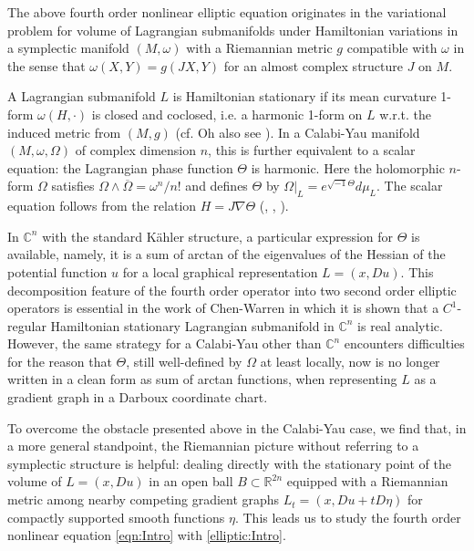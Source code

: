 \documentclass[12pt,leqno]{amsart}%
\theoremstyle{plain}
\numberwithin{equation}{section}
\theoremstyle{definition}
\begin{document}
The above fourth order nonlinear elliptic equation originates in the
variational problem for volume of Lagrangian submanifolds under Hamiltonian
variations in a symplectic manifold $(M,\omega)$ with a Riemannian metric $g$
compatible with $\omega$ in the sense that $\omega(X,Y) =g(JX,Y)$ for an
almost complex structure $J$ on $M$.

A Lagrangian submanifold $L$ is Hamiltonian stationary if its mean curvature
1-form $\omega(H, \cdot)$ is closed and coclosed, i.e. a harmonic 1-form on
$L$ w.r.t. the induced metric from $(M,g)$ (cf. Oh \cite{Oh} also see
\cite[p.1071-1072]{JLS}). In a Calabi-Yau
manifold $(M,\omega,\Omega)$ of complex dimension $n$, this is further equivalent to a scalar equation: the Lagrangian phase function $\Theta$ is harmonic.  Here the holomorphic
$n$-form $\Omega$ satisfies $\Omega\wedge\overline{\Omega}={\omega^{n}%
}/{n!}$ and defines $\Theta$ by $\Omega|_{L} = e^{\sqrt{-1}\Theta}d\mu_{L}$.  
The scalar equation follows from the relation $H=J\nabla\Theta$ (\cite{HL82}, \cite{Oh}, \cite{SWJDG}).

In $\mathbb{C}^{n}$ with the standard K\"ahler structure, a particular
expression for $\Theta$ is available, namely, it is a sum of arctan of the
eigenvalues of the Hessian of the potential function $u$ for a local graphical
representation $L = (x,Du)$. This decomposition feature of the fourth order
operator into two second order elliptic operators is essential in the work of
Chen-Warren \cite{CW} in which it is shown that a $C^{1}$-regular Hamiltonian
stationary Lagrangian submanifold in $\mathbb{C}^{n}$ is real analytic.
However, the same strategy for a Calabi-Yau other than $\mathbb{C}^{n}$
encounters difficulties for the reason that $\Theta$, still well-defined by
$\Omega$ at least locally, now is no longer written in a clean form as sum of
arctan functions, when representing $L$ as a gradient graph in a Darboux coordinate chart.

To overcome the obstacle presented above in the Calabi-Yau case, we find that,
in a more general standpoint, the Riemannian picture without referring to a
symplectic structure is helpful: dealing directly with the stationary point of
the volume of $L=(x,Du)$ in an open ball $B\subset\mathbb{R}^{2n}$ equipped
with a Riemannian metric among nearby competing gradient graphs $L_{t}=(x, Du
+t D\eta)$ for compactly supported smooth functions $\eta$. This leads us to
study the fourth order nonlinear equation \eqref{eqn:Intro} with \eqref{elliptic:Intro}.
\end{document}

